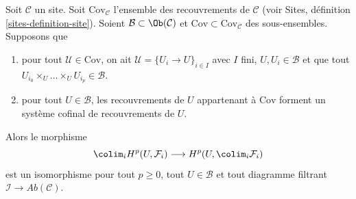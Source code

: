\begin{lemma}
\label{lemma-colim-works-over-collection}
Soit $\mathcal{C}$ un site. Soit $\text{Cov}_\mathcal{C}$ l'ensemble
des recouvrements de $\mathcal{C}$ (voir
Sites, définition \ref{sites-definition-site}). Soient
$\mathcal{B} \subset \Ob(\mathcal{C})$ et
$\text{Cov} \subset \text{Cov}_\mathcal{C}$
des sous-ensembles. Supposons que
\begin{enumerate}
\item pour tout $\mathcal{U} \in \text{Cov}$, on ait
$\mathcal{U} = \{U_i \to U\}_{i \in I}$ avec $I$ fini,
$U, U_i \in \mathcal{B}$ et que tout
$U_{i_0} \times_U \ldots \times_U U_{i_p} \in \mathcal{B}$.
\item pour tout $U \in \mathcal{B}$, les recouvrements de $U$
appartenant à $\text{Cov}$ forment un système cofinal de recouvrements de $U$.
\end{enumerate}
Alors le morphisme
$$
\colim_i H^p(U, \mathcal{F}_i)
\longrightarrow
H^p(U, \colim_i \mathcal{F}_i)
$$
est un isomorphisme pour tout $p \geq 0$, tout $U \in \mathcal{B}$ et
tout diagramme filtrant $\mathcal{I} \to \textit{Ab}(\mathcal{C})$.
\end{lemma}

